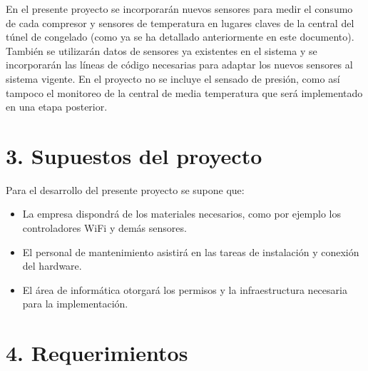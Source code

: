 \documentclass[
11pt, %
]{charter}
\begin{document}
En el presente proyecto se incorporarán nuevos sensores para medir el consumo de cada compresor y sensores de temperatura en lugares claves de la central del túnel de congelado (como ya se ha detallado anteriormente en este documento). También se utilizarán datos de sensores ya existentes en el sistema y se incorporarán las líneas de código necesarias para adaptar los nuevos sensores al sistema vigente. En el proyecto no se incluye el sensado de presión, como así tampoco el monitoreo de la central de media temperatura que será implementado en una etapa posterior.

\section{3. Supuestos del proyecto}
\label{sec:supuestos}

Para el desarrollo del presente proyecto se supone que:
\begin{itemize}
	\item La empresa dispondrá de los materiales necesarios, como por ejemplo los controladores WiFi y demás sensores.
	\item El personal de mantenimiento asistirá en las tareas de instalación y conexión del hardware.
	\item El área de informática otorgará los permisos y la infraestructura necesaria para la implementación.
\end{itemize}

\section{4. Requerimientos}
\label{sec:requerimientos}
\end{document}
